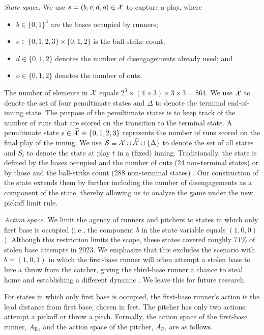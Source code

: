 \documentclass[aoas]{imsart}
\begin{document}
    \textit{State space.} We use $s=(b,c,d,o) \in {\cal X}$ to capture a play, where     
    \begin{itemize}
      \item $b \in \{0, 1\}^3$ are the bases occupied by runners;
      \item $c \in \{0, 1, 2, 3\} \times \{0, 1, 2\}$ is the ball-strike count;
      \item $d \in \{0, 1, 2\}$ denotes the number of disengagements already used; and
      \item $o \in \{0, 1, 2\}$ denotes the number of outs.
    \end{itemize}
    The number of elements in ${\cal X}$ equals $2^3 \times (4 \times 3) \times 3 \times 3 = 864$. We use $\widetilde{\cal X}$ to denote the set of four penultimate states and $\Delta$ to denote the terminal end-of-inning state. The purpose of the penultimate states is to keep track of the number of runs that are scored on the transition to the terminal state. A penultimate state $s \in \widetilde{\cal X} \equiv \{0, 1, 2, 3\}$ represents the number of runs scored on the final play of the inning. We use $\mathcal{S} \equiv \mathcal{X} \cup \widetilde{\cal X} \cup \{\Delta\}$ to denote the set of all states and $S_t$ to denote the state at play $t$ in a (fixed) inning. Traditionally, the state is defined by the bases occupied and the number of outs (24 non-terminal states) or by those and the ball-strike count (288 non-terminal states) \citep{bukiet_markov_1997}. Our construction of the state extends them by further including the number of disengagements as a component of the state, thereby allowing us to analyze the game under the new pickoff limit rule.

   \textit{Action space.} We limit the agency of runners and pitchers to states in which only first base is occupied (i.e., the component $b$ in the state variable equals $(1,0,0)$). Although this restriction limits the scope, these states covered roughly $71\%$ of stolen base attempts in 2023. We emphasize that this  excludes the scenario with $b = (1, 0, 1)$ in which the first-base runner will often attempt a stolen base to lure a throw from the catcher, giving the third-base runner a chance to steal home and establishing a different dynamic \citep{miller_first-and-third_2024}. We leave this for future research.
    
    For states in which only first base is occupied, the first-base runner's action is the lead distance from first base, chosen in feet. The pitcher has only two actions: attempt a pickoff or throw a pitch. Formally, the action space of the first-base runner, $A_{\text{R}}$, and the action space of the pitcher, $A_{\text{P}}$, are as follows.
    
\end{document}
